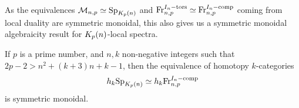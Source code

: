 
As the equivalences $\mathcal{M}_{n,p} \simeq \mathrm{Sp}_{K_p(n)}$ and $\mathrm{Fr}_{n,p}^{I_n-\mathrm{tors}} \simeq \mathrm{Fr}_{n,p}^{I_n-\mathrm{comp}}$ coming from local duality are symmetric monoidal, this also gives us a symmetric monoidal algebraicity result for ${K_p(n)}$-local spectra. 

\begin{corollary}
    If $p$ is a prime number, and $n, k$ non-negative integers such that $2p-2>n^2+(k+3)n+k-1$, then the equivalence of homotopy $k$-categories
    \[h_k \mathrm{Sp}_{K_p(n)}\simeq h_k \mathrm{Fr}_{n,p}^{I_n-\mathrm{comp}}\]
    is symmetric monoidal. 
\end{corollary}
